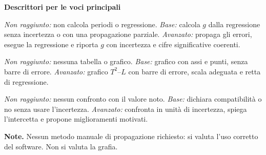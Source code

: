 \documentclass[10pt,a4paper]{article}
\begin{document}
\textbf{Descrittori per le voci principali}
\begin{description}[leftmargin=3.2cm,style=nextline,font=\small\bfseries]
\item[Analizzare i dati] \textit{Non raggiunto:} non calcola periodi o regressione. \textit{Base:} calcola $g$ dalla regressione senza incertezza o con una propagazione parziale. \textit{Avanzato:} propaga gli errori, esegue la regressione e riporta $g$ con incertezza e cifre significative coerenti.
\item[Rappresentare] \textit{Non raggiunto:} nessuna tabella o grafico. \textit{Base:} grafico con assi e punti, senza barre di errore. \textit{Avanzato:} grafico $T^2$--$L$ con barre di errore, scala adeguata e retta di regressione.
\item[Argomentare] \textit{Non raggiunto:} nessun confronto con il valore noto. \textit{Base:} dichiara compatibilità o no senza usare l'incertezza. \textit{Avanzato:} confronta in unità di incertezza, spiega l'intercetta e propone miglioramenti motivati.
\end{description}

\textbf{Note.} Nessun metodo manuale di propagazione richiesto: si valuta l'uso corretto del software. Non si valuta la grafia.
\end{document}
